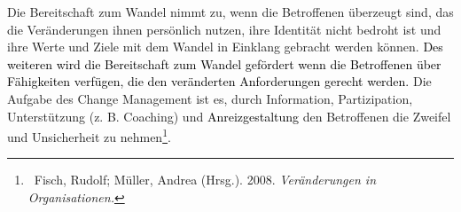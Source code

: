 \documentclass[a4paper]{article}
\begin{document}
\bigskip

{\sffamily
Die Bereitschaft zum Wandel nimmt zu, wenn die Betroffenen überzeugt sind, das die Veränderungen ihnen persönlich
nutzen, ihre Identität nicht bedroht ist und ihre Werte und Ziele mit dem Wandel in Einklang gebracht werden können.
\textcolor{black}{Des weiteren wird die Bereitschaft zum Wandel gefördert wenn die Betroffenen über Fähigkeiten
verfügen, die den veränderten Anforderungen gerecht werden. }Die Aufgabe des Change Management ist es, durch
Information, Partizipation, Unterstützung (z. B. Coaching) und \textcolor{black}{Anreizgestaltung} den Betroffenen die
Zweifel und Unsicherheit zu nehmen\footnote{\textcolor[rgb]{0.12941177,0.11764706,0.11764706}{\ Fisch, Rudolf; Müller,
Andrea (Hrsg.). 2008. }\textit{\textcolor[rgb]{0.12941177,0.11764706,0.11764706}{Veränderungen in Organisationen.}}}. }


\bigskip
\end{document}

